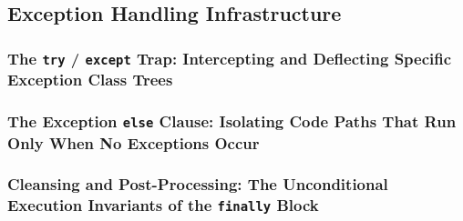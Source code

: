 \subsection{Exception Handling Infrastructure}
\subsubsection{The \texttt{try} / \texttt{except} Trap: Intercepting and Deflecting Specific Exception Class Trees}
\subsubsection{The Exception \texttt{else} Clause: Isolating Code Paths That Run Only When No Exceptions Occur}
\subsubsection{Cleansing and Post-Processing: The Unconditional Execution Invariants of the \texttt{finally} Block}
